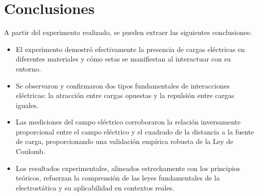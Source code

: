 \section{Conclusiones}
A partir del experimento realizado, se pueden extraer las siguientes conclusiones:
\begin{itemize}
    \item El experimento demostró efectivamente la presencia de cargas eléctricas en diferentes materiales y cómo estas se manifiestan al interactuar con su entorno.
    \item Se observaron y confirmaron dos tipos fundamentales de interacciones eléctricas: la atracción entre cargas opuestas y la repulsión entre cargas iguales.
    \item Las mediciones del campo eléctrico corroboraron la relación inversamente proporcional entre el campo eléctrico y el cuadrado de la distancia a la fuente de carga, proporcionando una validación empírica robusta de la Ley de Coulomb.
    \item Los resultados experimentales, alineados estrechamente con los principios teóricos, refuerzan la comprensión de las leyes fundamentales de la electrostática y su aplicabilidad en contextos reales.
\end{itemize}
